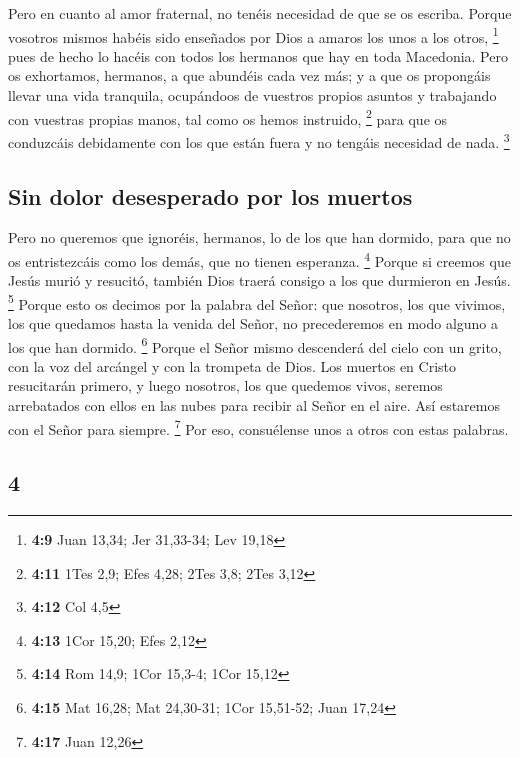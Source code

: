 \begin{paracol}{2}
 Pero en cuanto al amor fraternal, no tenéis necesidad de
que se os escriba. Porque vosotros mismos habéis sido enseñados por Dios
a amaros los unos a los otros, \footnote{\textbf{4:9} Juan 13,34; Jer
  31,33-34; Lev 19,18}  pues de hecho lo hacéis con todos
los hermanos que hay en toda Macedonia. Pero os exhortamos, hermanos, a
que abundéis cada vez más;  y a que os propongáis llevar
una vida tranquila, ocupándoos de vuestros propios asuntos y trabajando
con vuestras propias manos, tal como os hemos instruido, \footnote{\textbf{4:11}
  1Tes 2,9; Efes 4,28; 2Tes 3,8; 2Tes 3,12}  para que os
conduzcáis debidamente con los que están fuera y no tengáis necesidad de
nada. \footnote{\textbf{4:12} Col 4,5}

\hypertarget{sin-dolor-desesperado-por-los-muertos}{%
\subsection{Sin dolor desesperado por los
muertos}\label{sin-dolor-desesperado-por-los-muertos}}

 Pero no queremos que ignoréis, hermanos, lo de los que
han dormido, para que no os entristezcáis como los demás, que no tienen
esperanza. \footnote{\textbf{4:13} 1Cor 15,20; Efes 2,12}
 Porque si creemos que Jesús murió y resucitó, también
Dios traerá consigo a los que durmieron en Jesús. \footnote{\textbf{4:14}
  Rom 14,9; 1Cor 15,3-4; 1Cor 15,12}  Porque esto os
decimos por la palabra del Señor: que nosotros, los que vivimos, los que
quedamos hasta la venida del Señor, no precederemos en modo alguno a los
que han dormido. \footnote{\textbf{4:15} Mat 16,28; Mat 24,30-31; 1Cor
  15,51-52; Juan 17,24}  Porque el Señor mismo descenderá
del cielo con un grito, con la voz del arcángel y con la trompeta de
Dios. Los muertos en Cristo resucitarán primero,  y luego
nosotros, los que quedemos vivos, seremos arrebatados con ellos en las
nubes para recibir al Señor en el aire. Así estaremos con el Señor para
siempre. \footnote{\textbf{4:17} Juan 12,26}  Por eso,
consuélense unos a otros con estas palabras.

\switchcolumn
\begin{otherlanguage}{english}

\hypertarget{section-7}{%
\section{4}\label{section-7}}


\end{otherlanguage}
\end{paracol}
